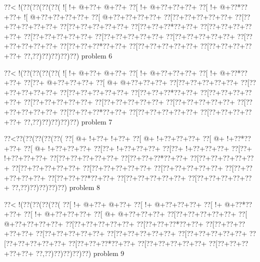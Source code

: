 \vbox{\vbox{\goo
\0??<\- !(\0??(\0??(\0??(\0??(
\- ![\- !+\- @+\0??+\- @+\0??+
\0??[\- !+\- @+\0??+\0??+\0??+
\0??[\- !+\- @+\0??*\0??+\0??+
\- ![\- @+\0??+\0??+\0??+\0??+
\0??[\- @+\0??+\0??+\0??+\0??+
\0??[\0??+\0??+\0??+\0??+\0??+
\0??[\0??+\0??+\0??+\0??+\0??+
\0??[\0??+\0??+\0??+\0??+\0??+
\0??[\0??+\0??+\0??*\0??+\0??+
\0??[\0??+\0??+\0??+\0??+\0??+
\0??[\0??+\0??+\0??+\0??+\0??+
\0??[\0??+\0??+\0??+\0??+\0??+
\0??[\0??+\0??+\0??+\0??+\0??+
\0??[\0??+\0??+\0??+\0??+\0??+
\0??[\0??+\0??+\0??*\0??+\0??+
\0??[\0??+\0??+\0??+\0??+\0??+
\0??[\0??+\0??+\0??+\0??+\0??+
\0??,\0??)\0??)\0??)\0??)\0??)
}
\hfil problem 6\hfil\break
}

\vbox{\vbox{\goo
\0??<\- !(\0??(\0??(\0??(\0??(
\- ![\- !+\- @+\0??+\- @+\0??+
\0??[\- !+\- @+\0??+\0??+\0??+
\0??[\- !+\- @+\0??*\0??+\0??+
\0??[\0??+\- @+\0??+\0??+\0??+
\0??[\- @+\- @+\0??+\0??+\0??+
\0??[\0??+\0??+\0??+\0??+\0??+
\0??[\0??+\0??+\0??+\0??+\0??+
\0??[\0??+\0??+\0??+\0??+\0??+
\0??[\0??+\0??+\0??*\0??+\0??+
\0??[\0??+\0??+\0??+\0??+\0??+
\0??[\0??+\0??+\0??+\0??+\0??+
\0??[\0??+\0??+\0??+\0??+\0??+
\0??[\0??+\0??+\0??+\0??+\0??+
\0??[\0??+\0??+\0??+\0??+\0??+
\0??[\0??+\0??+\0??*\0??+\0??+
\0??[\0??+\0??+\0??+\0??+\0??+
\0??[\0??+\0??+\0??+\0??+\0??+
\0??,\0??)\0??)\0??)\0??)\0??)
}
\hfil problem 7\hfil\break
}

\vbox{\vbox{\goo
\0??<\0??(\0??(\0??(\0??(\0??(
\0??[\- @+\- !+\0??+\- !+\0??+
\0??[\- @+\- !+\0??+\0??+\0??+
\0??[\- @+\- !+\0??*\0??+\0??+
\0??[\- @+\- !+\0??+\0??+\0??+
\0??[\0??+\- !+\0??+\0??+\0??+
\0??[\0??+\- !+\0??+\0??+\0??+
\0??[\0??+\- !+\0??+\0??+\0??+
\0??[\0??+\0??+\0??+\0??+\0??+
\0??[\0??+\0??+\0??*\0??+\0??+
\0??[\0??+\0??+\0??+\0??+\0??+
\0??[\0??+\0??+\0??+\0??+\0??+
\0??[\0??+\0??+\0??+\0??+\0??+
\0??[\0??+\0??+\0??+\0??+\0??+
\0??[\0??+\0??+\0??+\0??+\0??+
\0??[\0??+\0??+\0??*\0??+\0??+
\0??[\0??+\0??+\0??+\0??+\0??+
\0??[\0??+\0??+\0??+\0??+\0??+
\0??,\0??)\0??)\0??)\0??)\0??)
}
\hfil problem 8\hfil\break
}

\vbox{\vbox{\goo
\0??<\- !(\0??(\0??(\0??(\0??(
\0??[\- !+\- @+\0??+\- @+\0??+
\0??[\- !+\- @+\0??+\0??+\0??+
\0??[\- !+\- @+\0??*\0??+\0??+
\0??[\- !+\- @+\0??+\0??+\0??+
\0??[\- @+\- @+\0??+\0??+\0??+
\0??[\0??+\0??+\0??+\0??+\0??+
\0??[\- @+\0??+\0??+\0??+\0??+
\0??[\0??+\0??+\0??+\0??+\0??+
\0??[\0??+\0??+\0??*\0??+\0??+
\0??[\0??+\0??+\0??+\0??+\0??+
\0??[\0??+\0??+\0??+\0??+\0??+
\0??[\0??+\0??+\0??+\0??+\0??+
\0??[\0??+\0??+\0??+\0??+\0??+
\0??[\0??+\0??+\0??+\0??+\0??+
\0??[\0??+\0??+\0??*\0??+\0??+
\0??[\0??+\0??+\0??+\0??+\0??+
\0??[\0??+\0??+\0??+\0??+\0??+
\0??,\0??)\0??)\0??)\0??)\0??)
}
\hfil problem 9\hfil\break
}

